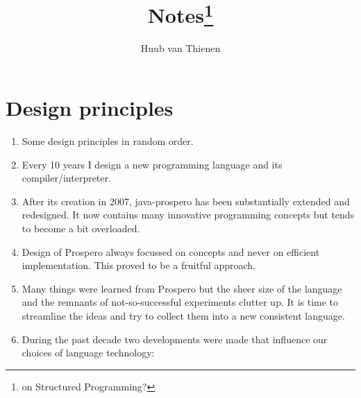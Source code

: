 \documentclass[11pt, a4paper]{article}
\begin{document}
\title{Notes\footnote{on Structured Programming?}}
\author{Huub van Thienen}
\maketitle

\section{Design principles}

\begin{enumerate}
\item Some design principles in random order.

\item Every 10 years I design a new programming language and its compiler/interpreter.


\item After its creation in 2007, java-prospero has been substantially extended and 
redesigned. It now contains many innovative programming concepts but tends to become 
a bit overloaded.

\item Design of Prospero always focussed on concepts and never on efficient implementation.
This proved to be a fruitful approach.

\item Many things were learned from Prospero but the sheer size of the language and 
the remnants of not-so-successful experiments clutter up. It is time to streamline the 
ideas and try to collect them into a new consistent language.

\item During the past decade two developments were made that influence our choices of 
language technology:



\end{enumerate}
\end{document}
